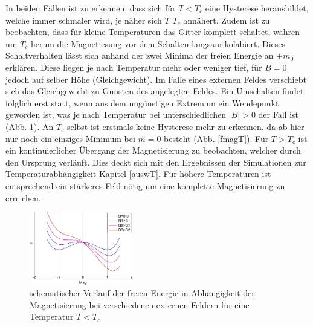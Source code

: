 In beiden Fällen ist zu erkennen, dass sich für $T<T_{c}$ eine Hysterese herausbildet, welche immer schmaler wird, je näher sich $T$ $T_{c}$ annähert. Zudem ist zu beobachten, dass für kleine Temperaturen das Gitter komplett schaltet, währen um $T_{c}$ herum die Magnetiesung vor dem Schalten langsam kolabiert. Dieses Schaltverhalten lässt sich anhand der zwei Minima der freien Energie an $\pm m_{0}$ erklären. Diese liegen je nach Temperatur mehr oder weniger tief, für $B=0$ jedoch auf selber Höhe (Gleichgewicht). Im Falle eines externen Feldes verschiebt sich das Gleichgewicht zu Gunsten des angelegten Feldes. Ein Umschalten findet folglich erst statt, wenn aus dem ungünstigen Extremum ein Wendepunkt geworden ist, was je nach Temperatur bei unterschiedlichen $|B|>0$ der Fall ist (Abb. \ref{fmagB}). An $T_{c}$ selbst ist erstmals keine Hysterese mehr zu erkennen, da ab hier nur noch ein einziges Minimum bei $m=0$ besteht (Abb. \ref{fmagT}). Für $T>T_{c}$ ist ein kontinuierlicher Übergang der Magnetisierung zu beobachten, welcher durch den Ursprung verläuft. Dies deckt sich mit den Ergebnissen der Simulationen zur Temperaturabhängigkeit Kapitel \ref{auswT}. Für höhere Temperaturen ist entsprechend ein stärkeres Feld nötig um eine komplette Magnetisierung zu erreichen. 
\begin{figure}[H]
	\centering
	\includegraphics[width=0.4\textwidth]{../Graph_Export/F(mag)_B.jpg}
	\caption{schematischer Verlauf der freien Energie in Abhängigkeit der Magnetisierung bei verschiedenen externen Feldern für eine Temperatur $T<T_c$}
	\label{fmagB}
\end{figure}

